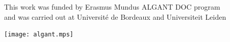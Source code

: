 \begin{center}
  \noindent This work was funded by Erasmus Mundus ALGANT DOC program\\
  and was carried out at Université de Bordeaux and  Universiteit Leiden

  \vspace{1em}

  \noindent{}\hspace{0.9cm}
  \hspace{0.9cm}
  \texttt{[image: algant.mps]}
\end{center}
